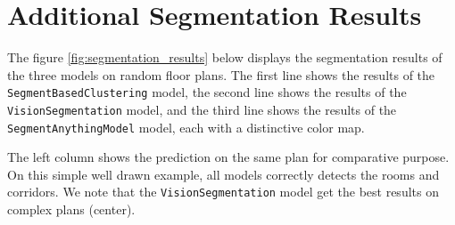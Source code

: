 \documentclass[11pt]{article}
\begin{document}

\section{Additional Segmentation Results}

The figure \ref{fig:segmentation_results} below displays the segmentation results of the three models on random
floor plans. The first line shows the results of the \texttt{SegmentBasedClustering} model,
the second line shows the results of the \texttt{VisionSegmentation} model, and the third line
shows the results of the \texttt{SegmentAnythingModel} model, each with a 
distinctive color map.

The left column shows the prediction on the same plan for comparative purpose. 
On this simple well drawn example, all models correctly detects the rooms and
corridors. 
We note that the \texttt{VisionSegmentation} model get the best results on complex plans (center).
\end{document}
